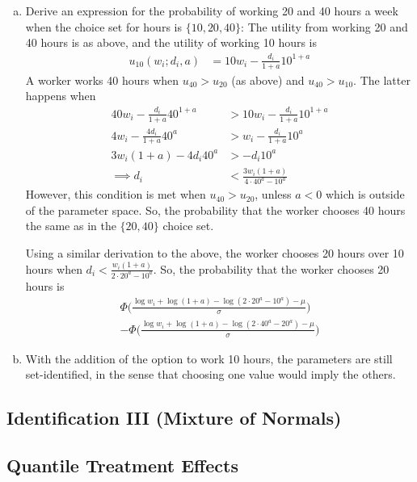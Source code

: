 \documentclass[11pt]{article}
\begin{document}
\begin{enumerate}[a)]
	\item Derive an expression for the probability of working 20 and 40 hours a week when the choice set for hours is $\{ 10,20,40 \}$: The utility from working 20 and 40 hours is as above, and the utility of working 10 hours is
	\begin{align*}
		u_{10}(w_i;d_i,a) &= 10 w_i - \frac{d_i}{1+a} 10^{1+a}
	\end{align*}
	A worker works 40 hours when $u_{40} > u_{20}$ (as above) and $u_{40} > u_{10}$. The latter happens when
	\begin{align*}
		40 w_i - \frac{d_i}{1+a} 40^{1+a} &> 10 w_i - \frac{d_i}{1+a} 10^{1+a} \\
		4 w_i - \frac{4d_i}{1+a} 40^{a} &> w_i - \frac{d_i}{1+a} 10^{a} \\
		3 w_i (1+a) - 4d_i 40^{a} &> - d_i 10^{a} \\
		\implies d_i &< \frac{3w_i(1+a)}{4 \cdot 40^a - 10^a}
	\end{align*}
	However, this condition is met when $u_{40} > u_{20}$, unless $a < 0$ which is outside of the parameter space. So, the probability that the worker chooses 40 hours the same as in the $\{20,40\}$ choice set.

	Using a similar derivation to the above, the worker chooses 20 hours over 10 hours when $d_i < \frac{w_i (1+a)}{2 \cdot 20^a - 10^a}$. So, the probability that the worker chooses 20 hours is
	\begin{align*}
		\Phi \bigg( \frac{\log w_i + \log (1+a) - \log(2 \cdot 20^a - 10^a) - \mu}{\sigma} \bigg)  \\ - \Phi \bigg( \frac{\log w_i + \log (1+a) - \log(2 \cdot 40^a - 20^a) - \mu}{\sigma} \bigg)
	\end{align*}
	
	\item With the addition of the option to work 10 hours, the parameters are still set-identified, in the sense that choosing one value would imply the others.

\end{enumerate}

\subsection*{Identification III (Mixture of Normals)}

\subsection*{Quantile Treatment Effects}
\end{document}
